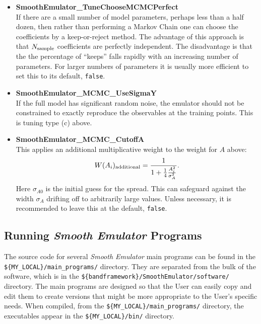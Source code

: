 \documentclass[UserManual.tex]{subfiles}
\begin{document}
\begin{itemize}
\item {\bf SmoothEmulator\_TuneChooseMCMCPerfect}\\
If there are a small number of model parameters, perhaps less than a half dozen, then rather than performing a Markov Chain one can choose the coefficients by a keep-or-reject method. The advantage of this approach is that $N_{\rm sample}$ coefficients are perfectly independent. The disadvantage is that the the percentage of ``keeps'' falls rapidly with an increasing number of parameters. For larger numbers of parameters it is usually more efficient to set this to its default, {\tt false}. 

\item {\bf SmoothEmulator\_MCMC\_UseSigmaY}\\
If the full model has significant random noise, the emulator should not be constrained to exactly reproduce the observables at the training points. This is tuning type (c) above. 

\item {\bf SmoothEmulator\_MCMC\_CutoffA}\\
This applies an additional multiplicative weight to the weight for $A$ above:
\[
W(A_i)_{\rm additional}=\frac{1}{1+\frac{1}{4}\frac{A_i^2}{\sigma_{A}^2}}.
\] 
Here $\sigma_{A0}$ is the initial guess for the spread. This can safeguard against the width $\sigma_A$ drifting off to arbitrarily large values. Unless necessary, it is recommended to leave this at the default, {\tt false}.

\end{itemize}

\subsection{Running {\it Smooth Emulator} Programs}

The source code for several {\it Smooth Emulator} main programs can be found in the \\{\tt \$\{MY\_LOCAL\}/main\_programs/} directory. They are separated from the bulk of the software, which is in the {\tt \$\{bandframework\}/SmoothEmulator/software/} directory. The main programs are designed so that the User can easily copy and edit them to create versions that might be more appropriate to the User's specific needs. When compiled, from the {\tt \$\{MY\_LOCAL\}/main\_programs/} directory, the executables appear in the {\tt \$\{MY\_LOCAL\}/bin/} directory. 
\end{document}
